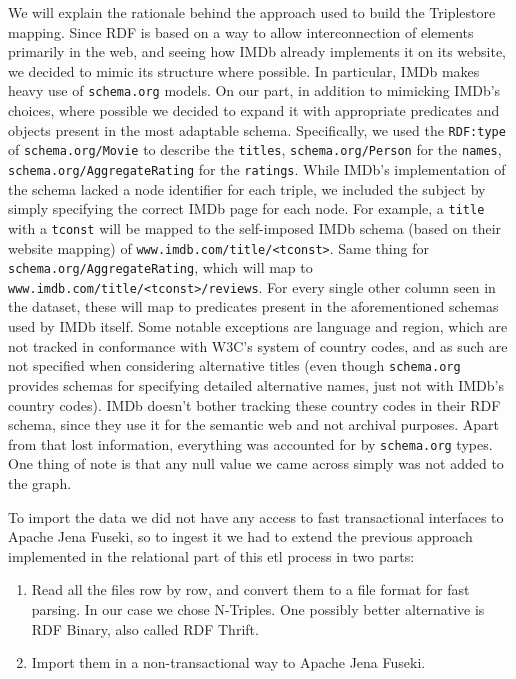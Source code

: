 \documentclass[a4paper,10pt]{article}
\begin{document}
We will explain the rationale behind the approach used to build the
Triplestore mapping. Since RDF is based on a way to allow
interconnection of elements primarily in the web, and seeing how IMDb
already implements it on its website, we decided to mimic its
structure where possible. In particular, IMDb makes heavy use of
\texttt{schema.org} models. On our part, in addition to mimicking
IMDb's choices, where possible we decided to expand it with
appropriate predicates and objects present in the most adaptable
schema. Specifically, we used the \texttt{RDF:type} of
\texttt{schema.org/Movie} to describe the \texttt{titles},
\texttt{schema.org/Person} for the \texttt{names},
\texttt{schema.org/AggregateRating} for the \texttt{ratings}. While
IMDb's implementation of the schema lacked a node identifier for each
triple, we included the subject by simply specifying the correct IMDb
page for each node. For example, a \texttt{title} with a
\texttt{tconst} will be mapped to the self-imposed IMDb schema (based
on their website mapping) of
\texttt{www.imdb.com/title/<tconst>}. Same thing for
\texttt{schema.org/AggregateRating}, which will map to
\texttt{www.imdb.com/title/<tconst>/reviews}. For every single other
column seen in the dataset, these will map to predicates present in
the aforementioned schemas used by IMDb itself. Some notable
exceptions are language and region, which are not tracked in
conformance with W3C's system of country codes, and as such are not
specified when considering alternative titles (even though
\texttt{schema.org} provides schemas for specifying detailed
alternative names, just not with IMDb's country codes). IMDb doesn't
bother tracking these country codes in their RDF schema, since they
use it for the semantic web and not archival purposes. Apart from that
lost information, everything was accounted for by \texttt{schema.org}
types. One thing of note is that any null value we came across simply
was not added to the graph.

To import the data we did not have any access to fast transactional
interfaces to Apache Jena Fuseki, so to ingest it we had to extend the
previous approach implemented in the relational part of this etl
process in two parts:

\begin{enumerate}
  \item Read all the files row by row, and convert them to a file
  format for fast parsing. In our case we chose N-Triples. One
  possibly better alternative is RDF Binary, also called RDF Thrift.
  \item Import them in a non-transactional way to Apache Jena Fuseki.
\end{enumerate}
\end{document}
